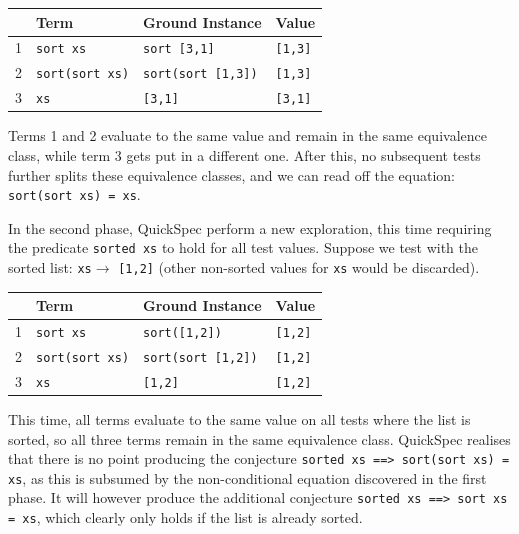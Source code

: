 \begin{tabularx}{\textwidth}{l  X  X  X}
 & Term & Ground Instance & Value \\
 \hline
1 \quad &\texttt{sort xs} & \texttt{sort [3,1]} & \texttt{[1,3]} \\
2 \quad&\texttt{sort(sort xs)} &\texttt{sort(sort [1,3])} & \texttt{[1,3]}\\
3 \quad &\texttt{xs} &\texttt{[3,1]} & \texttt{[3,1]} \\
\end{tabularx}

\noindent Terms 1 and 2 evaluate to the same value and remain in the same equivalence class, while term 3 gets put in a different one. After this, no subsequent tests further splits these equivalence classes, and we can read off the equation: \texttt{sort(sort xs) = xs}.

In the second phase, QuickSpec perform a new exploration, this time requiring the predicate \texttt{sorted xs} to hold for all test values. Suppose we test with the sorted list: \texttt{xs}$ \rightarrow$ \texttt{[1,2]} (other non-sorted values for \texttt{xs} would be discarded).       

\begin{tabularx}{\textwidth}{l  X  X  X}
 & Term & Ground Instance & Value \\
 \hline
1 \quad &\texttt{sort xs} & \texttt{sort([1,2])} & \texttt{[1,2]} \\
2 \quad&\texttt{sort(sort xs)} &\texttt{sort(sort [1,2])} & \texttt{[1,2]}\\
3 \quad &\texttt{xs} &\texttt{[1,2]} & \texttt{[1,2]} \\
\end{tabularx}

\noindent This time, all terms evaluate to the same value on all tests where the list is sorted, so all three terms remain in the same equivalence class. QuickSpec realises that there is no point producing the conjecture \texttt{sorted xs ==> sort(sort xs) = xs}, as this is subsumed by the non-conditional equation discovered in the first phase. It will however produce the additional conjecture \texttt{sorted xs ==> sort xs = xs}, which clearly only holds if the list is already sorted.